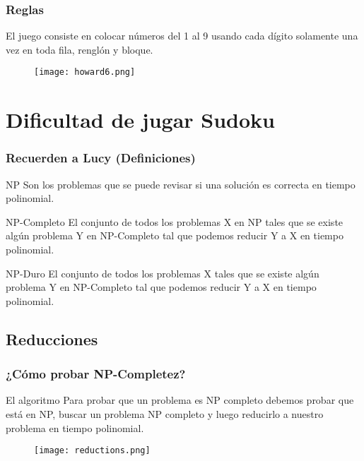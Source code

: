 \documentclass{beamer}
\begin{document}

\begin{frame}
\frametitle{Reglas}
El juego consiste en colocar números del 1 al 9 usando cada dígito solamente una vez en toda fila, renglón y bloque.

\begin{figure}
\centering
  \texttt{[image: howard6.png]}
\end{figure}

\end{frame}

\section{Dificultad de jugar Sudoku}

\begin{frame}
\frametitle{Recuerden a Lucy (Definiciones)}
\begin{block}{NP}
Son los problemas que se puede revisar si una solución es correcta en tiempo polinomial.
\end{block}
\begin{block}{NP-Completo}
El conjunto de todos los problemas X en NP tales que se existe algún problema Y en NP-Completo tal que podemos reducir Y a X en tiempo polinomial.
\end{block}
\begin{block}{NP-Duro}
El conjunto de todos los problemas X tales que se existe algún problema Y en NP-Completo tal que podemos reducir Y a X en tiempo polinomial.
\end{block}

\end{frame}


\subsection{Reducciones}
\begin{frame}

\frametitle{¿Cómo probar NP-Completez?}
\begin{block}{El algoritmo}
Para probar que un problema es NP completo debemos probar que está en NP, buscar un problema NP completo y luego reducirlo a nuestro problema en tiempo polinomial.
\end{block}
\begin{figure}
\centering
  \texttt{[image: reductions.png]}
\end{figure}
\end{frame}
\end{document}
